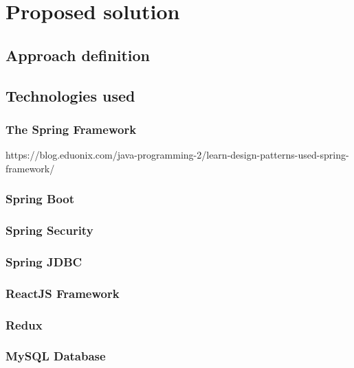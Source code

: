 \chapter{Proposed solution}
\label{chapter:proposedSolution}

\section{Approach definition}
\label{section:approachDefinition}


\section{Technologies used}
\label{section:technologiesUsed}


\subsection{The Spring Framework}
\label{subsection:springBootFramework}

https://blog.eduonix.com/java-programming-2/learn-design-patterns-used-spring-framework/

\subsection{Spring Boot}
\label{subsection:springBoot}

\subsection{Spring Security}
\label{subsection:proposedSolution}

\subsection{Spring JDBC}
\label{subsection:springJDBC}

\subsection{ReactJS Framework}
\label{section:reactJSFramework}

\subsection{Redux}
\label{section:redux}

\subsection{MySQL Database}
\label{section:mysqlDatabase}



